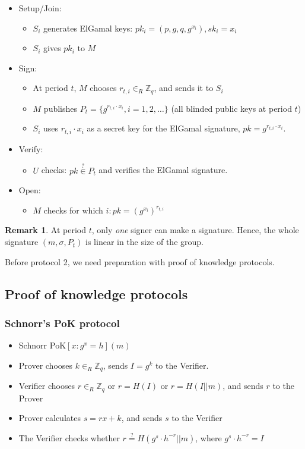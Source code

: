 \documentclass[11pt]{article}
\theoremstyle{definition}
\newtheorem{remark}{Remark}[section]
\theoremstyle{proof}
\begin{document}
\begin{itemize}
	\item Setup/Join:
	\begin{itemize}
		\item $S_i$ generates ElGamal keys: $pk_i = (p, g, q, g^{x_i}), sk_i = x_i$
		\item $S_i$ gives $pk_i$ to $M$
	\end{itemize}
	\item Sign:
	\begin{itemize}
		\item At period $t$, $M$ chooses $r_{t,i} \in_R \mathbb{Z}_q$, and sends it to $S_i$
		\item $M$ publishes $P_t = \{g^{r_{t,i} \cdot x_i}, i = 1, 2, \dots\}$ (all blinded public keys at period $t$)
		\item $S_i$ uses $r_{t, i} \cdot x_i$ as a secret key for the ElGamal signature, $pk = g^{r_{t, i} \cdot x_i}$.
	\end{itemize}
	\item Verify:
	\begin{itemize}
		\item $U$ checks: $pk \stackrel{?}{\in} P_t$ and verifies the ElGamal signature.
	\end{itemize}
	\item Open:
	\begin{itemize}
		\item $M$ checks for which $i: pk = (g^{x_i})^{r_{t, i}}$
	\end{itemize}
\end{itemize}

\begin{remark}
	At period $t$, only \emph{one} signer can make a signature. Hence, the whole signature $(m, \sigma, P_t)$ is linear in the size of the group.
\end{remark}

Before protocol 2, we need preparation with proof of knowledge protocols.

\subsection{Proof of knowledge protocols}

\subsubsection{Schnorr's PoK protocol}

\begin{itemize}
	\item Schnorr $\text{PoK}[x: g^x = h](m)$	
	\item Prover chooses $k \in_R \mathbb{Z}_q$, sends $I = g^k$ to the Verifier.
	\item Verifier chooses $r \in_R \mathbb{Z}_q \text{ or } r = H(I) \text{ or } r = H(I || m)$, and sends $r$ to the Prover
	\item Prover calculates $s = rx + k$, and sends $s$ to the Verifier
	\item The Verifier checks whether $r \stackrel{?}{=} H(g^s \cdot h^{-r} || m)$, where $g^s \cdot h^{-r} = I$
\end{itemize}
\end{document}

